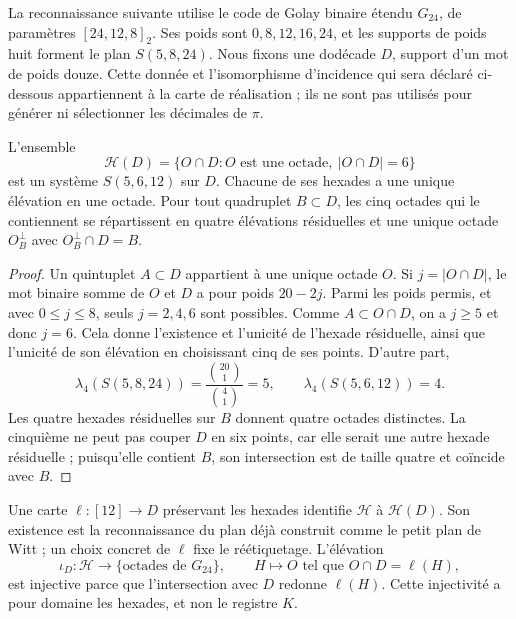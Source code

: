 La reconnaissance suivante utilise le code de Golay binaire
étendu $G_{24}$, de paramètres $[24,12,8]_2$. Ses poids sont
$0,8,12,16,24$, et les supports de poids huit forment le plan
$S(5,8,24)$. Nous fixons une dodécade $D$, support d'un mot de poids
douze. Cette donnée et l'isomorphisme d'incidence qui sera déclaré
ci-dessous appartiennent à la carte de réalisation ; ils ne sont pas utilisés pour
générer ni sélectionner les décimales de $\pi$.

\begin{proposition}
\label{x_reciprocidad:exc:residuo-binario}
L'ensemble
\[
 \mathcal H(D)=
 \{O\cap D: O\text{ est une octade},\ |O\cap D|=6\}
\]
est un système $S(5,6,12)$ sur $D$. Chacune de ses hexades a une unique élévation en une octade. Pour tout quadruplet $B\subset D$, les cinq octades qui le contiennent se répartissent en quatre élévations résiduelles et une unique octade $O_B^\perp$ avec $O_B^\perp\cap D=B$.
\end{proposition}

\begin{proof}
Un quintuplet $A\subset D$ appartient à une unique octade $O$. Si
$j=|O\cap D|$, le mot binaire somme de $O$ et $D$ a pour poids
$20-2j$. Parmi les poids permis, et avec $0\leq j\leq8$, seuls
$j=2,4,6$ sont possibles. Comme $A\subset O\cap D$, on a $j\geq5$
et donc $j=6$. Cela donne l'existence et l'unicité de l'hexade
résiduelle, ainsi que l'unicité de son élévation en choisissant cinq de ses
points. D'autre part,
\[
 \lambda_4(S(5,8,24))=\frac{\binom{20}1}{\binom41}=5,
 \qquad
 \lambda_4(S(5,6,12))=4.
\]
Les quatre hexades résiduelles sur $B$ donnent quatre octades distinctes. La cinquième ne peut pas couper $D$ en six points, car elle serait une autre hexade résiduelle ; puisqu'elle contient $B$, son intersection est de taille quatre et coïncide avec $B$.
\end{proof}

Une carte $\ell:[12]\to D$ préservant les hexades identifie
$\mathcal H$ à $\mathcal H(D)$. Son existence est la reconnaissance
du plan déjà construit comme le petit plan de Witt ; un choix
concret de $\ell$ fixe le réétiquetage. L'élévation
\[
 \iota_D:\mathcal H\longrightarrow
       \{\text{octades de }G_{24}\},
 \qquad H\longmapsto O\text{ tel que }O\cap D=\ell(H),
\]
est injective parce que l'intersection avec $D$ redonne $\ell(H)$. Cette injectivité a pour domaine les hexades, et non le registre $K$.

